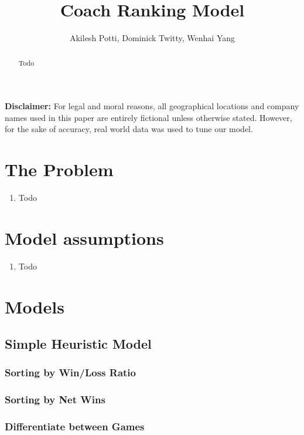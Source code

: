 \documentclass[titlepage]{article}
\begin{document}
\title{Coach Ranking Model}
\author{Akilesh Potti, Dominick Twitty, Wenhai Yang}
\maketitle

\begin{abstract}
Todo
\end{abstract}



\noindent\textbf{Disclaimer:} For legal and moral reasons, all geographical locations and company names used in this paper are entirely fictional unless otherwise stated. However, for the sake of accuracy, real world data was used to tune our model.


\section{The Problem}
\begin{enumerate}
\item Todo
\end{enumerate}


\section{Model assumptions}
\begin{enumerate}
\item Todo
\end{enumerate}

\section{Models}

\subsection{Simple Heuristic Model}
\subsubsection{Sorting by Win/Loss Ratio}
\subsubsection{Sorting by Net Wins}
\subsubsection{Differentiate between Games}
\end{document}
